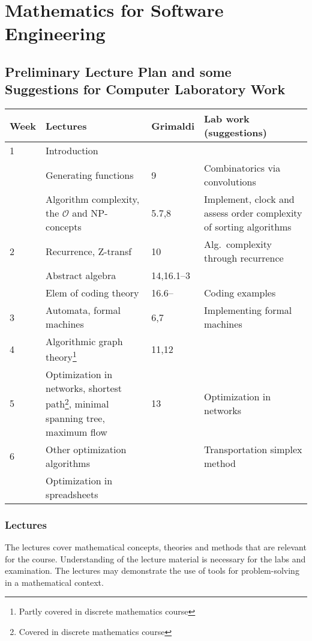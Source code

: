 \documentclass[10pt]{article}
\begin{document}
\section*{Mathematics for Software Engineering} 
\subsection*{Preliminary Lecture Plan and some\\
  Suggestions for Computer Laboratory Work}

\vspace{3ex}
\savenotes
\begin{tabular}{|p{}|p{}|p{}|
    p{}|}
  \hline
  Week&Lectures&Grimaldi&Lab work (suggestions)\\
  \hline %
  1 & Introduction & &
  \\
  & Generating functions %
  & 9 & Combinatorics via convolutions
  \\
  & Algorithm complexity, the $\mathcal{O}$ and NP-concepts & 5.7,8 &
  Implement, clock and assess order complexity of sorting algorithms
  \\\hline %
  2 & Recurrence, Z-transf & 10 & Alg.~complexity through recurrence \\
  &Abstract algebra&14,16.1--3&\\
   &Elem of coding theory&16.6--& Coding examples \\
  \hline
  3&Automata, formal machines&6,7&Implementing formal machines\\
  \hline
  4&Algorithmic graph theory\footnote{Partly covered in discrete
    mathematics course}&11,12&\\
  \hline
  5&Optimization in networks, shortest path\footnote{Covered in
    discrete mathematics course}, minimal spanning tree\footnotemark[2],
  maximum flow&13&Optimization in networks\\
  \hline
  6&Other optimization algorithms&
  &Transportation simplex method\\
  &Optimization in spreadsheets&&\\
  \hline
\end{tabular}
\spewnotes
\vspace{3ex}

\subsubsection*{Lectures}
The lectures cover mathematical concepts, theories and methods that
are relevant for the course. Understanding of the lecture material is
necessary for the labs and examination. The lectures may demonstrate
the use of tools for problem-solving in a mathematical context.
\end{document}
